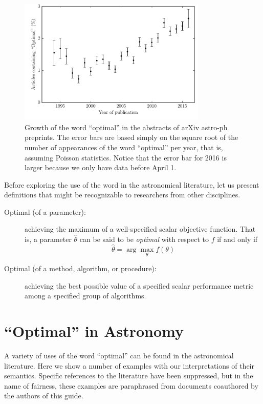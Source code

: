 \documentclass[12pt, preprint]{aastex}
\begin{document}
\begin{figure}[ht!]
  \begin{center}
    \includegraphics[width=0.8\textwidth]{yearly.pdf}
  \end{center}
  \caption{Growth of the word ``optimal'' in the abstracts of arXiv
    astro-ph preprints.  The error bars are based simply on the square
    root of the number of appearances of the word ``optimal'' per
    year, that is, assuming Poisson statistics.  Notice that the error
    bar for 2016 is larger because we only have data before April 1.}
\end{figure}


Before exploring the use of the word in the astronomical literature, let
us present definitions that might be recognizable to researchers from other
disciplines.

\begin{description}
\item[Optimal (of a parameter):] achieving the maximum of a
  well-specified scalar objective function.  That is, a parameter
  $\hat{\theta}$ can be said to be \emph{optimal} with respect to $f$
  if and only if
  \[
  \hat{\theta} = \arg\max_{\theta} f(\theta)
  \]
\item[Optimal (of a method, algorithm, or procedure):] achieving the
  best possible value of a specified scalar performance metric among a
  specified group of algorithms.
\end{description}

\section{``Optimal'' in Astronomy}

A variety of uses of the word ``optimal'' can be found in the 
astronomical literature.
Here we show a number of examples with our interpretations of their
semantics.
%
Specific references to the literature have been suppressed, but in the
name of fairness, these examples are paraphrased from documents
coauthored by the authors of this guide.
\end{document}
